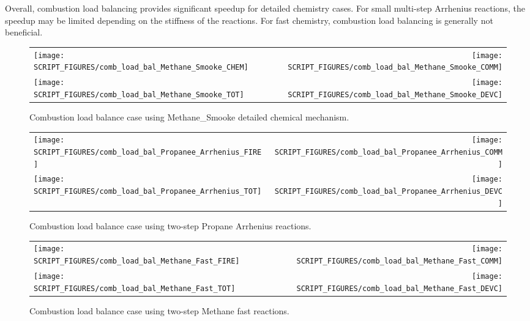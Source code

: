 \documentclass[11pt]{book}
\begin{document}
Overall, combustion load balancing provides significant speedup for detailed chemistry cases. For small multi-step Arrhenius reactions, the speedup may be limited depending on the stiffness of the reactions. For fast chemistry, combustion load balancing is generally not beneficial.


\begin{figure}[p]
\begin{tabular*}{\textwidth}{lr}
\texttt{[image: SCRIPT\_FIGURES/comb\_load\_bal\_Methane\_Smooke\_CHEM]} &
\texttt{[image: SCRIPT\_FIGURES/comb\_load\_bal\_Methane\_Smooke\_COMM]} \\
\texttt{[image: SCRIPT\_FIGURES/comb\_load\_bal\_Methane\_Smooke\_TOT]} &
\texttt{[image: SCRIPT\_FIGURES/comb\_load\_bal\_Methane\_Smooke\_DEVC]}
\end{tabular*}
\caption[Results of the {\ct comb\_load\_balance} test cases]{Combustion load balance case using Methane\_Smooke detailed chemical mechanism.}
\label{fig:comb_load_bal_methane_smooke}
\end{figure}

\begin{figure}[p]
\begin{tabular*}{\textwidth}{lr}
\texttt{[image: SCRIPT\_FIGURES/comb\_load\_bal\_Propanee\_Arrhenius\_FIRE]} &
\texttt{[image: SCRIPT\_FIGURES/comb\_load\_bal\_Propanee\_Arrhenius\_COMM]} \\
\texttt{[image: SCRIPT\_FIGURES/comb\_load\_bal\_Propanee\_Arrhenius\_TOT]} &
\texttt{[image: SCRIPT\_FIGURES/comb\_load\_bal\_Propanee\_Arrhenius\_DEVC]}
\end{tabular*}
\caption[Results of the {\ct comb\_load\_balance} test cases]{Combustion load balance case using two-step Propane Arrhenius reactions.}
\label{fig:comb_load_bal_2step_Arrhenius}
\end{figure}

\begin{figure}[p]
\begin{tabular*}{\textwidth}{lr}
\texttt{[image: SCRIPT\_FIGURES/comb\_load\_bal\_Methane\_Fast\_FIRE]} &
\texttt{[image: SCRIPT\_FIGURES/comb\_load\_bal\_Methane\_Fast\_COMM]} \\
\texttt{[image: SCRIPT\_FIGURES/comb\_load\_bal\_Methane\_Fast\_TOT]} &
\texttt{[image: SCRIPT\_FIGURES/comb\_load\_bal\_Methane\_Fast\_DEVC]}
\end{tabular*}
\caption[Results of the {\ct comb\_load\_balance} test cases]{Combustion load balance case using two-step Methane fast reactions.}
\label{fig:comb_load_bal_2step_fast}
\end{figure}
\end{document}
